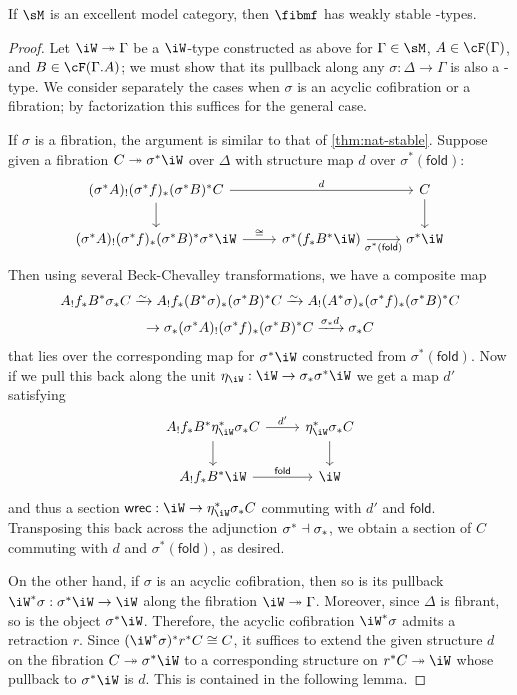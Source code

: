 \documentclass{amsart}
\let\W\iW
\let\F\cF
\def\fold{\mathsf{fold}}
\def\wrec{\mathsf{wrec}}
\begin{document}
\begin{thm}\label{thm:wk-w}
  If $\sM$ is an excellent model category, then $\fibmf$ has weakly stable \W-types.
\end{thm}
\begin{proof}
  Let $\W\fib\Gamma$ be a $\W$-type constructed as above for $\Gamma\in\sM$, $A\in\F(\Gamma)$, and $B\in\F(\Gamma.A)$; we must show that its pullback along any $\sigma:\Delta\to\Gamma$ is also a \W-type.
  We consider separately the cases when $\sigma$ is an acyclic cofibration or a fibration; by factorization this suffices for the general case.

  If $\sigma$ is a fibration, the argument is similar to that of \cref{thm:nat-stable}.
  Suppose given a fibration $C\fib \sigma^*\W$ over $\Delta$ with structure map $d$ over $\sigma^*(\fold)$:
  \[
  \begin{tikzcd}
    (\sigma^* A)_! (\sigma^* f)_* (\sigma^*B)^* C \ar[rr,"d"] \ar[d] && C \ar[d] \\
    (\sigma^* A)_! (\sigma^* f)_* (\sigma^*B)^* \sigma^* \W \ar[r,"\cong"] & \sigma^*(f_* B^* \W) \ar[r,"{\sigma^*(\fold)}",swap] & \sigma^*\W
  \end{tikzcd}
  \]
  Then using several Beck-Chevalley transformations, we have a composite map
  \begin{multline*}
    A_! f_* B^* \sigma_* C
    \toiso A_! f_* (B^*\sigma)_* (\sigma^*B)^* C
    \toiso A_! (A^*\sigma)_* (\sigma^* f)_* (\sigma^*B)^* C\\
    \to \sigma_* (\sigma^* A)_! (\sigma^* f)_* (\sigma^*B)^* C
    \xto{\sigma_* d} \sigma_* C
  \end{multline*}
  that lies over the corresponding map for $\sigma^*\W$ constructed from $\sigma^*(\fold)$.
  Now if we pull this back along the unit $\eta_\W : \W \to \sigma_* \sigma^* \W$ we get a map $d'$ satisfying
  \[
  \begin{tikzcd}
    A_! f_* B^* \eta_\W^* \sigma_* C \ar[r,"d'"] \ar[d] & \eta_\W^* \sigma_* C \ar[d] \\
    A_! f_* B^* \W \ar[r,"\fold"] & \W
  \end{tikzcd}
  \]
  and thus a section $\wrec:\W\to \eta_\W^* \sigma_* C$ commuting with $d'$ and $\fold$.
  Transposing this back across the adjunction $\sigma^* \dashv \sigma_*$, we obtain a section of $C$ commuting with $d$ and $\sigma^*(\fold)$, as desired.

  On the other hand, if $\sigma$ is an acyclic cofibration, then so is its pullback $\W^*\sigma : \sigma^*\W \to \W$ along the fibration $\W\fib\Gamma$.
  Moreover, since $\Delta$ is fibrant, so is the object $\sigma^*\W$.
  Therefore, the acyclic cofibration $\W^*\sigma$ admits a retraction $r$.
  Since $(\W^*\sigma)^* r^* C \cong C$, it suffices to extend the given structure $d$ on the fibration $C\fib\sigma^*\W$ to a corresponding structure on $r^* C\fib\W$ whose pullback to $\sigma^*\W$ is $d$.
  This is contained in the following lemma.
\end{proof}
\end{document}
